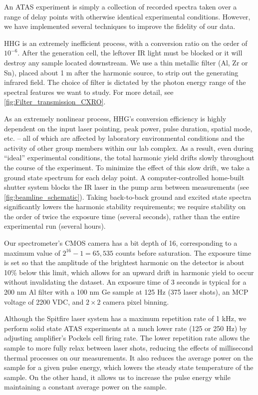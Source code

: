 An ATAS experiment is simply a collection of recorded spectra taken over a range of delay points with otherwise identical experimental conditions. However, we have implemented several techniques to improve the fidelity of our data.

HHG is an extremely inefficient process, with a conversion ratio on the order of $10^{-6}$. After the generation cell, the leftover IR light must be blocked or it will destroy any sample located downstream. We use a thin metallic filter (Al, Zr or Sn), placed about 1 m after the harmonic source, to strip out the generating infrared field. The choice of filter is dictated by the photon energy range of the spectral features we want to study. For more detail, see \cref{fig:Filter_transmission_CXRO}.

As an extremely nonlinear process, HHG's conversion efficiency is highly dependent on the input laser pointing, peak power, pulse duration, spatial mode, etc. -- all of which are affected by laboratory environmental conditions and the activity of other group members within our lab complex. As a result, even during ``ideal'' experimental conditions, the total harmonic yield drifts slowly throughout the course of the experiment. To minimize the effect of this slow drift, we take a ground state spectrum for each delay point. A computer-controlled home-built shutter system blocks the IR laser in the pump arm between measurements (see \cref{fig:beamline_schematic}). Taking back-to-back ground and excited state spectra significantly lowers the harmonic stability requirements; we require stability on the order of twice the exposure time (several seconds), rather than the entire experimental run (several hours).

Our spectrometer's CMOS camera has a bit depth of 16, corresponding to a maximum value of $2^{16}-1 = 65,535$ counts before saturation. The exposure time is set so that the amplitude of the brightest harmonic on the detector is about 10\% below this limit, which allows for an upward drift in harmonic yield to occur without invalidating the dataset. An exposure time of 3 seconds is typical for a 200 nm Al filter with a 100 nm Ge sample at 125 Hz (375 laser shots), an MCP voltage of 2200 VDC, and $2\times2$ camera pixel binning.

Although the Spitfire laser system has a maximum repetition rate of 1 kHz, we perform solid state ATAS experiments at a much lower rate (125 or 250 Hz) by adjusting amplifier's Pockels cell firing rate. The lower repetition rate allows the sample to more fully relax between laser shots, reducing the effects of millisecond thermal processes on our measurements. It also reduces the average power on the sample for a given pulse energy, which lowers the steady state temperature of the sample. On the other hand, it allows us to increase the pulse energy while maintaining a constant average power on the sample.

